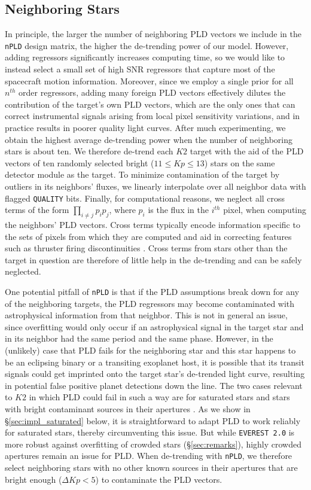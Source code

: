 \documentclass[]{emulateapj}
\newcommand{\Kp}{\ensuremath{Kp}}
\begin{document}
\subsection{Neighboring Stars}
\label{sec:impl_neighboring}
In principle, the larger the number of neighboring PLD vectors we include in the
\texttt{nPLD} design matrix, the higher the de-trending power of our model. However, adding 
regressors significantly increases computing time, so we would like to instead select
a small set of high SNR regressors that capture most of the spacecraft
motion information. Moreover, since we employ a single prior for all $n^{th}$ order
regressors, adding many foreign PLD vectors effectively dilutes the contribution of
the target's own PLD vectors, which are the only ones that can correct instrumental
signals arising from local pixel sensitivity variations, and in practice results
in poorer quality light curves. After much experimenting, we obtain the highest average 
de-trending power when the number of neighboring stars is about ten. We therefore de-trend
each $K2$ target with the aid of the PLD vectors of ten randomly selected bright 
($11 \leq \Kp \leq 13$) stars on the same detector module as the target. To minimize
contamination of the target by outliers in its neighbors' fluxes, we linearly
interpolate over all neighbor data with flagged \texttt{QUALITY} bits. Finally, for
computational reasons, we neglect all cross terms of the form $\prod_{i \neq j} p_i p_j$,
where $p_i$ is the flux in the $i^{th}$ pixel,
when computing the neighbors' PLD vectors. Cross terms typically encode information
specific to the sets of pixels from which they are computed and aid in correcting
features such as thruster firing discontinuities \citep{Luger16}. Cross terms from
stars other than the target in question are therefore of little help in the de-trending
and can be safely neglected.

One potential pitfall of \texttt{nPLD} is that if the PLD assumptions break down for
any of the neighboring targets, the PLD regressors may become contaminated with
astrophysical information from that neighbor. This is not in general an issue, since
overfitting would only occur if an astrophysical signal in the target star and in
its neighbor had the same period and the same phase. However, in the (unlikely) case
that PLD fails for the neighboring star and this star happens to be an eclipsing binary 
or a transiting exoplanet host, it is possible that its transit signals could get imprinted onto
the target star's de-trended light curve, resulting in potential false positive planet
detections down the line. The two cases relevant to $K2$ in which PLD could fail in such
a way are for saturated stars and stars with bright contaminant sources in their
apertures \citep{Luger16}. As we show in \S\ref{sec:impl_saturated} below, it is 
straightforward to adapt PLD to work reliably for saturated stars, thereby circumventing
this issue. But while 
\texttt{EVEREST 2.0} is more robust against overfitting of crowded stars 
(\S\ref{sec:remarks}), highly crowded apertures remain an issue for PLD. When de-trending
with \texttt{nPLD}, we therefore select neighboring stars with no other known sources
in their apertures that are bright enough ($\Delta \Kp < 5$) to contaminate the PLD
vectors.
\end{document}
